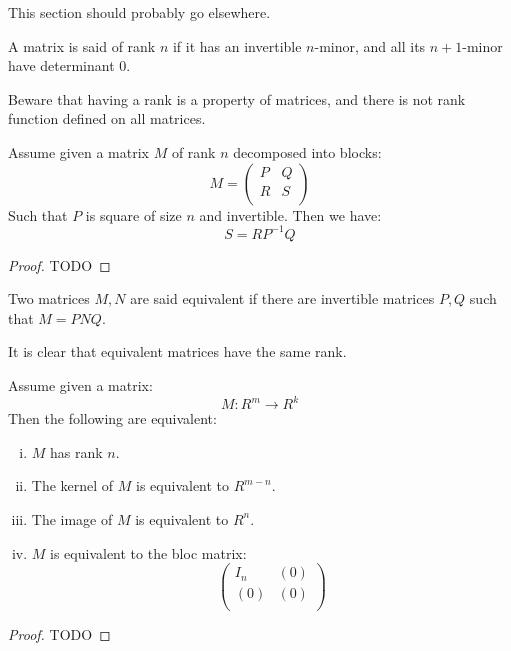 This section should probably go elsewhere.

\begin{definition}
A matrix is said of rank $n$ if it has an invertible $n$-minor, and all its $n+1$-minor have determinant $0$.
\end{definition}

Beware that having a rank is a property of matrices, and there is not rank function defined on all matrices.

\begin{lemma}\label{rank-bloc-matrix}
Assume given a matrix $M$ of rank $n$ decomposed into blocks:
\[M = \begin{pmatrix}
P & Q  \\
R & S \\
\end{pmatrix}\]
Such that $P$ is square of size $n$ and invertible. Then we have:
\[S = RP^{-1}Q\]
\end{lemma}

\begin{proof}
TODO
\end{proof}

\begin{definition}
Two matrices $M,N$ are said equivalent if there are invertible matrices $P,Q$ such that $M = PNQ$.
\end{definition}

It is clear that equivalent matrices have the same rank.

\begin{lemma}\label{rank-equivalent-definitions}
Assume given a matrix:
\[M : R^m\to R^k\]
Then the following are equivalent:
\begin{enumerate}[(i)]
\item $M$ has rank $n$.
\item The kernel of $M$ is equivalent to $R^{m-n}$.
\item The image of $M$ is equivalent to $R^n$.
\item $M$ is equivalent to the bloc matrix:
\[\begin{pmatrix}
I_n & (0)  \\
(0) & (0) \\
\end{pmatrix}\]
\end{enumerate}
\end{lemma}

\begin{proof}
TODO
\end{proof}
